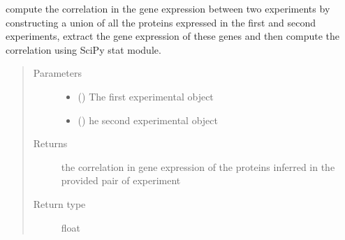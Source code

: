 \documentclass[letterpaper,10pt,english]{sphinxmanual}
\begin{document}
\begin{fulllineitems}
\label{\detokenize{IPTK.Analysis:IPTK.Analysis.AnalysisFunction.compute_expression_correlation}}
compute the correlation in the gene expression between two experiments by constructing a union
of all the proteins expressed in the first and second experiments, extract the gene expression 
of these genes and then compute the correlation using SciPy stat module.
\begin{quote}\begin{description}
\item[{Parameters}] \leavevmode\begin{itemize}
\item {} 
 ({\hyperref[\detokenize{IPTK.Classes:IPTK.Classes.Experiment.Experiment}]{}}) \textendash{} The first experimental object

\item {} 
 ({\hyperref[\detokenize{IPTK.Classes:IPTK.Classes.Experiment.Experiment}]{}}) \textendash{} he second experimental object

\end{itemize}

\item[{Returns}] \leavevmode
the correlation in gene expression of the proteins inferred in the provided pair of experiment

\item[{Return type}] \leavevmode
float

\end{description}\end{quote}

\end{fulllineitems}

\end{document}
